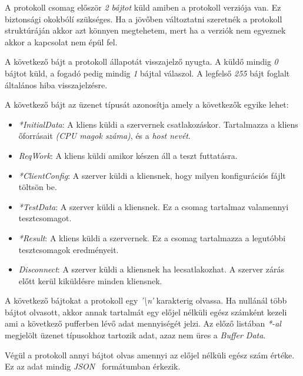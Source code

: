             A protokoll csomag először \emph{2 bájtot} küld amiben a protokoll verziója van. Ez biztonsági okokbólí
            szükséges. Ha a jövőben változtatni szeretnék a protokoll struktúráján akkor azt könnyen megtehetem, mert
            ha a verziók nem egyeznek akkor a kapcsolat nem épül fel.

            A következő bájt a protokoll állapotát visszajelző nyugta. A küldő mindig \textit{0} bájtot küld, a fogadó
            pedig mindig \textit{1} bájtal válaszol. A legfelső \textit{255} bájt foglalt általános hiba
            visszajelzésre.

            A következő bájt az üzenet típusát azonosítja amely a következők egyike lehet:

            \begin{itemize}
                \item \textit{*InitialData}: A kliens küldi a szervernek csatlakozáskor. Tartalmazza a kliens őforrásait
                      \textit{(CPU magok száma)}, és a \textit{host nevét}.
                \item \textit{ReqWork}: A kliens küldi amikor készen áll a teszt futtatásra.
                \item \textit{*ClientConfig}: A szerver küldi a kliensnek, hogy milyen konfigurációs fájlt töltsön be.
                \item \textit{*TestData}: A szerver küldi a kliensnek. Ez a csomag tartalmaz valamennyi tesztcsomagot.
                \item \textit{*Result}: A kliens küldi a szervernek. Ez a csomag tartalmazza a legutóbbi tesztcsomagok
                      eredményeit.
                \item \textit{Disconnect}: A szerver küldi a kliensnek ha lecsatlakozhat. A szerver zárás előtt kerül
                      kiküldésre minden kliensnek.
            \end{itemize}

            A következő bájtokat a protokoll egy \textit{'\textbackslash{}n'} karakterig olvassa. Ha nullánál több
            bájtot olvasott, akkor annak tartalmát egy előjel nélküli egész számként kezeli ami a következő pufferben
            lévő adat mennyiségét jelzi. Az előző listában \textit{*-al} megjelölt üzenet típusokhoz tartozik adat,
            azaz nem üres a \textit{Buffer Data}.

            Végül a protokoll annyi bájtot olvas amennyi az előjel nélküli egész szám értéke. Ez az adat mindig
            \textit{JSON}~\cite{json} formátumban érkezik.

